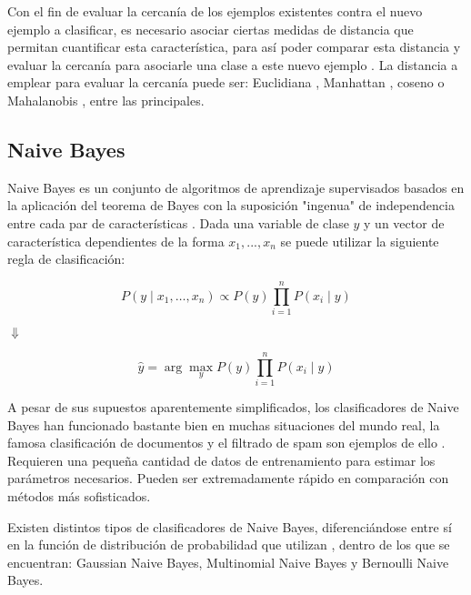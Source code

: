 Con el fin de evaluar la cercanía de los ejemplos existentes contra el nuevo ejemplo a clasificar, es necesario asociar ciertas medidas de distancia que permitan cuantificar esta característica, para así poder comparar esta distancia y evaluar la cercanía para asociarle una clase a este nuevo ejemplo \cite{5408784}. La distancia a emplear para evaluar la cercanía puede ser: Euclidiana \cite{DANIELSSON1980227}, Manhattan \cite{PERLIBAKAS2004711}, coseno \cite{LIAO20155328} o Mahalanobis \cite{DEMAESSCHALCK20001}, entre las principales.

\subsection{Naive Bayes}

Naive Bayes es un conjunto de algoritmos de aprendizaje supervisados basados en la aplicación del teorema de Bayes con la suposición "ingenua" de independencia entre cada par de características \cite{zhang2004optimality}. Dada una variable de clase $y$ y un vector de característica dependientes de la forma $x_1,..., x_n$ se puede utilizar la siguiente regla de clasificación:

\begin{equation}
	P(y \mid x_1, \dots, x_n) \propto P(y) \prod_{i=1}^{n} P(x_i \mid y)
\end{equation}

\begin{center}
	$\Downarrow$ 
\end{center}
\begin{equation}
	\hat{y} = \arg\max_y P(y) \prod_{i=1}^{n} P(x_i \mid y)
\end{equation}

A pesar de sus supuestos aparentemente simplificados, los clasificadores de Naive Bayes han funcionado bastante bien en muchas situaciones del mundo real, la famosa clasificación de documentos y el filtrado de spam son ejemplos de ello \cite{10.1007/BFb0026666, Chen2009, metsis2006spam}. Requieren una pequeña cantidad de datos de entrenamiento para estimar los parámetros necesarios. Pueden ser extremadamente rápido en comparación con métodos más sofisticados. 

Existen distintos tipos de clasificadores de Naive Bayes, diferenciándose entre sí en la función de distribución de probabilidad que utilizan \cite{metsis2006spam,john1995estimating,manning2010introduction}, dentro de los que se encuentran: Gaussian Naive Bayes, Multinomial Naive Bayes y Bernoulli Naive Bayes.

